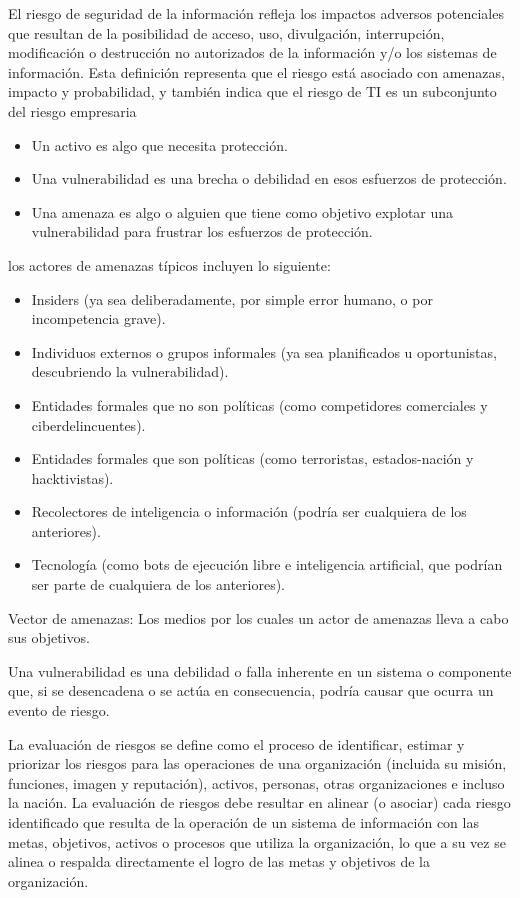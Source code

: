 El riesgo de seguridad de la información refleja los impactos adversos potenciales que resultan de la posibilidad de acceso, uso, divulgación, interrupción, modificación o destrucción no autorizados de la información y/o los sistemas de información. Esta definición representa que el riesgo está asociado con amenazas, impacto y probabilidad, y también indica que el riesgo de TI es un subconjunto del riesgo empresaria

\begin{itemize}
    \item Un activo es algo que necesita protección.
    \item Una vulnerabilidad es una brecha o debilidad en esos esfuerzos de protección.
    \item Una amenaza es algo o alguien que tiene como objetivo explotar una vulnerabilidad para frustrar los esfuerzos de protección.

\end{itemize}

los actores de amenazas típicos    incluyen lo siguiente:

\begin{itemize}
    \item Insiders (ya sea deliberadamente, por simple error humano, o por incompetencia grave).
    \item Individuos externos o grupos informales (ya sea planificados u oportunistas, descubriendo la vulnerabilidad).
    \item Entidades formales que no son políticas (como competidores comerciales y ciberdelincuentes).
    \item Entidades formales que son políticas (como terroristas, estados-nación y hacktivistas).
    \item Recolectores de inteligencia o información (podría ser cualquiera de los anteriores).
    \item Tecnología (como bots de ejecución libre e inteligencia artificial, que podrían ser parte de cualquiera de los anteriores).

\end{itemize}
Vector de amenazas: Los medios por los cuales un actor de amenazas lleva a cabo sus objetivos.

Una vulnerabilidad es una debilidad o falla inherente en un sistema o componente que, si se desencadena o se actúa en consecuencia, podría causar que ocurra un evento de riesgo.

 La evaluación de riesgos se define como el proceso de identificar, estimar y priorizar los riesgos para las operaciones de una organización (incluida su misión, funciones, imagen y reputación), activos, personas, otras organizaciones e incluso la nación. La evaluación de riesgos debe resultar en alinear (o asociar) cada riesgo identificado que resulta de la operación de un sistema de información con las metas, objetivos, activos o procesos que utiliza la organización, lo que a su vez se alinea o respalda directamente el logro de las metas y objetivos de la organización.

